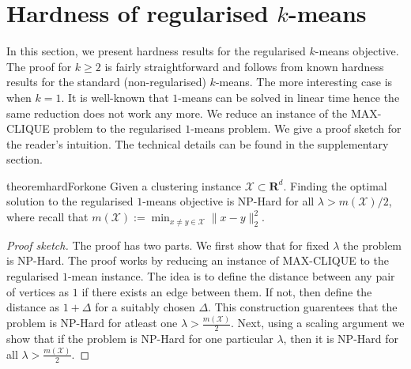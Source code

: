 \documentclass[12pt]{article}
\newcommand{\mc}{\mathcal}
\newcommand{\mb}{\mathbf}
\begin{document}
\section{Hardness of regularised $k$-means}
\label{section:hardness}

In this section, we present hardness results for the regularised $k$-means objective. 
The proof for $k \ge 2$ is fairly straightforward and follows from known hardness results for the standard (non-regularised) $k$-means. The more interesting case is when $k = 1$. It is well-known that $1$-means can be solved in linear time \cite{Bellman73} hence the same reduction does not work any more. We reduce an instance of the MAX-CLIQUE problem to the regularised $1$-means problem. We give a proof sketch for the reader's intuition. The technical details can be found in the supplementary section.


\begin{restatable}{theorem}{hardForkone}
\label{theorem:hardFork1}
Given a clustering instance $\mc X \subset \mb R^d$. Finding the optimal solution to the regularised $1$-means objective is NP-Hard for all $\lambda > m(\mc X)/2$, where recall that $m(\mc X) := \min_{x\ne y \in \mc X} \|x-y\|_2^2$.
\end{restatable}

\begin{proof}[Proof sketch]
The proof has two parts. We first show that for fixed $\lambda$ the problem is NP-Hard. The proof works by reducing an instance of MAX-CLIQUE to the regularised $1$-mean instance. The idea is to define the distance between any pair of vertices as $1$ if there exists an edge between them. If not, then define the distance as $1 + \Delta$ for a suitably chosen $\Delta$. This construction guarentees that the problem is NP-Hard for atleast one $\lambda > \frac{m(\mc X)}{2}$. Next, using a scaling argument we show that if the problem is NP-Hard for one particular $\lambda$, then it is NP-Hard for all $\lambda > \frac{m(\mc X)}{2}$.
\end{proof}
\end{document}

